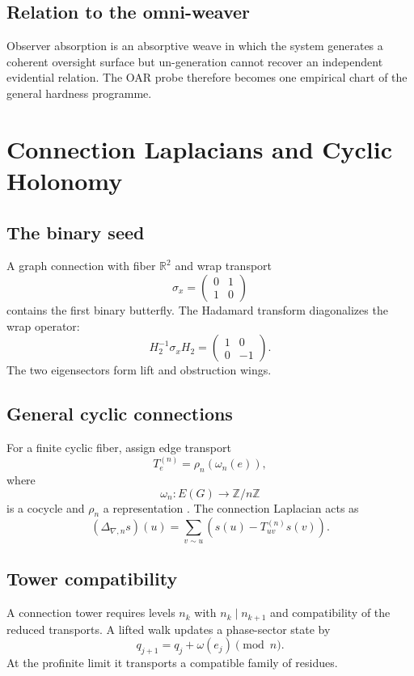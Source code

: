 \documentclass[12pt,openany]{book}
\theoremstyle{remark}
\begin{document}
\section{Relation to the omni-weaver}
Observer absorption is an absorptive weave in which the system generates a coherent oversight surface but un-generation cannot recover an independent evidential relation. The OAR probe therefore becomes one empirical chart of the general hardness programme.

\chapter{Connection Laplacians and Cyclic Holonomy}
\label{ch:connection-laplacian}

\section{The binary seed}
A graph connection with fiber $\mathbb R^2$ and wrap transport
\[
\sigma_x=
\begin{pmatrix}
0&1\\
1&0
\end{pmatrix}
\]
contains the first binary butterfly. The Hadamard transform diagonalizes the wrap operator:
\[
H_2^{-1}\sigma_xH_2
=
\begin{pmatrix}
1&0\\
0&-1
\end{pmatrix}.
\]
The two eigensectors form lift and obstruction wings.

\section{General cyclic connections}
For a finite cyclic fiber, assign edge transport
\[
T_e^{(n)}=\rho_n(\omega_n(e)),
\]
where
\[
\omega_n:E(G)\to\mathbb Z/n\mathbb Z
\]
is a cocycle and $\rho_n$ a representation \cite{Zaslavsky,Chung}. The connection Laplacian \cite{SingerWu,BandeiraSingerSpielman} acts as
\[
(\Delta_{\nabla,n}s)(u)
=
\sum_{v\sim u}
\left(s(u)-T_{uv}^{(n)}s(v)\right).
\]

\section{Tower compatibility}
A connection tower requires levels $n_k$ with $n_k\mid n_{k+1}$ and compatibility of the reduced transports. A lifted walk updates a phase-sector state by
\[
q_{j+1}=q_j+\omega(e_j)\pmod n.
\]
At the profinite limit it transports a compatible family of residues.
\end{document}
